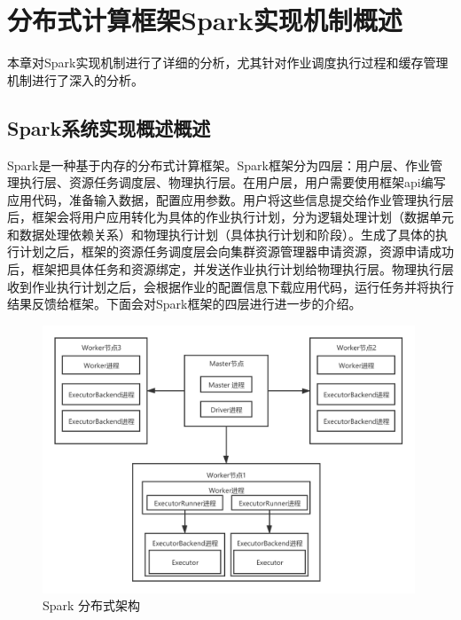 \chapter{分布式计算框架Spark实现机制概述}\label{chap:basic}

本章对Spark实现机制进行了详细的分析，尤其针对作业调度执行过程和缓存管理机制进行了深入的分析。

\section{Spark系统实现概述概述}
Spark是一种基于内存的分布式计算框架。Spark框架分为四层：用户层、作业管理执行层、资源任务调度层、物理执行层。在用户层，用户需要使用框架api编写应用代码，准备输入数据，配置应用参数。用户将这些信息提交给作业管理执行层后，框架会将用户应用转化为具体的作业执行计划，分为逻辑处理计划（数据单元和数据处理依赖关系）和物理执行计划（具体执行计划和阶段）。生成了具体的执行计划之后，框架的资源任务调度层会向集群资源管理器申请资源，资源申请成功后，框架把具体任务和资源绑定，并发送作业执行计划给物理执行层。物理执行层收到作业执行计划之后，会根据作业的配置信息下载应用代码，运行任务并将执行结果反馈给框架。下面会对Spark框架的四层进行进一步的介绍。

\begin{figure}[htbp]
    \centering
    \includegraphics[width=0.99\textwidth]{Img/Spark部署架构图.png}
    \caption{Spark 分布式架构}
    \label{fig:spark-framework}
\end{figure}

